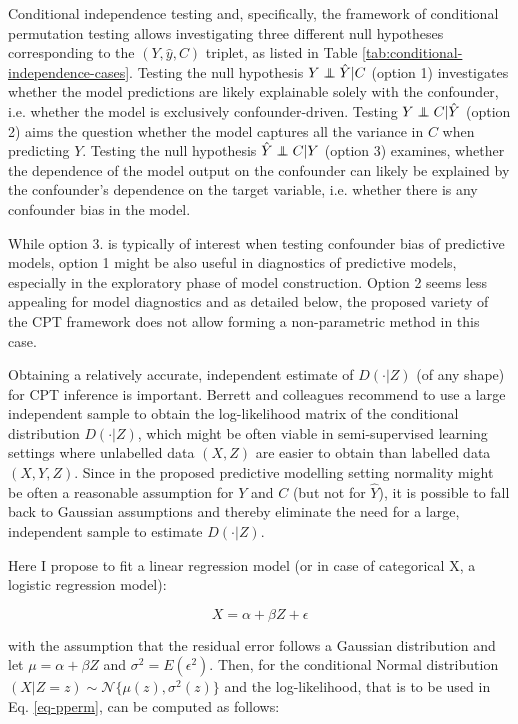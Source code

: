 \documentclass{article}
\begin{document}
Conditional independence testing and, specifically, the framework of conditional permutation testing allows investigating three different null hypotheses corresponding to the $(Y, \hat{y}, C)$ triplet, as listed in Table \ref{tab:conditional-independence-cases}. Testing the null hypothesis $Y \independent \hat{Y} | C$ (option 1) investigates whether the model predictions are likely explainable solely with the confounder, i.e. whether the model is exclusively confounder-driven. Testing $Y \independent C | \hat{Y}$ (option 2) aims the question whether the model captures all the variance in $C$ when predicting $Y$. Testing the null hypothesis $\hat{Y} \independent C | Y$ (option 3) examines, whether the dependence of the model output on the confounder can likely be explained by the confounder's dependence on the target variable, i.e. whether there is any confounder bias in the model.

While option 3. is typically of interest when testing confounder bias of predictive models, option 1 might be also useful in diagnostics of predictive models, especially in the exploratory phase of model construction. Option 2 seems less appealing for model diagnostics and as detailed below, the proposed variety of the CPT framework does not allow forming a non-parametric method in this case.

Obtaining a relatively accurate, independent estimate of $D(\cdot|Z)$ (of any shape) for CPT inference is important. Berrett and colleagues recommend to use a large independent sample to obtain the log-likelihood matrix of the conditional distribution $D(\cdot|Z)$, which might be often viable in semi-supervised learning settings where unlabelled data $(X, Z)$ are easier to obtain than labelled data $(X, Y, Z)$.
Since in the proposed predictive modelling setting normality might be often a reasonable assumption for $Y$ and $C$ (but not for $\hat{Y}$), it is possible to fall back to Gaussian assumptions and thereby eliminate the need for a large, independent sample to estimate $D(\cdot|Z)$.

Here I propose to fit a linear regression model (or in case of categorical X, a logistic regression model):

\begin{equation}
    \label{eq:linreg}
    X = \alpha + \beta Z + \epsilon
\end{equation}


with the assumption that the residual error follows a Gaussian distribution and let $\mu = \alpha + \beta Z$ and $\sigma^2 = E(\epsilon^2)$. Then, for the conditional Normal distribution $ (X|Z=z) \sim \mathcal{N}\{\mu(z), \sigma^2(z)\}$ and the log-likelihood, that is to be used in Eq. \ref{eq-pperm}, can be computed as follows:
\end{document}
